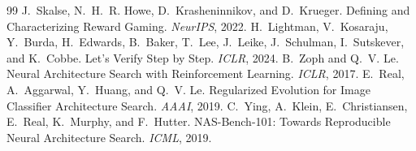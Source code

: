 \documentclass{article}
\begin{document}
\begin{thebibliography}{99}
 J.~Skalse, N.~H.~R. Howe, D.~Krasheninnikov, and D.~Krueger. Defining and Characterizing Reward Gaming. \emph{NeurIPS}, 2022.
 H.~Lightman, V.~Kosaraju, Y.~Burda, H.~Edwards, B.~Baker, T.~Lee, J.~Leike, J.~Schulman, I.~Sutskever, and K.~Cobbe. Let's Verify Step by Step. \emph{ICLR}, 2024.
 B.~Zoph and Q.~V. Le. Neural Architecture Search with Reinforcement Learning. \emph{ICLR}, 2017.
 E.~Real, A.~Aggarwal, Y.~Huang, and Q.~V. Le. Regularized Evolution for Image Classifier Architecture Search. \emph{AAAI}, 2019.
 C.~Ying, A.~Klein, E.~Christiansen, E.~Real, K.~Murphy, and F.~Hutter. NAS-Bench-101: Towards Reproducible Neural Architecture Search. \emph{ICML}, 2019.
\end{thebibliography}
\end{document}
